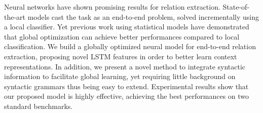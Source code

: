 Neural networks have shown promising results for relation extraction. State-of-the-art models cast the task as an end-to-end problem, solved incrementally using a local classifier. Yet previous work using statistical models have demonstrated that global optimization can achieve better performances compared to local classification. We build a globally optimized neural model for end-to-end relation extraction, proposing novel LSTM features in order to better learn context representations. In addition, we present a novel method to integrate syntactic information to facilitate global learning, yet requiring little background on syntactic grammars thus being easy to extend. Experimental results show that our proposed model is highly effective, achieving the best performances on two standard benchmarks.
